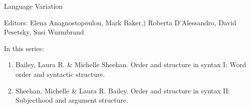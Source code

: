 {\large Language Variation}

\bigskip

Editors:   Elena Anagnostopoulou,
    Mark Baker,)
    Roberta D’Alessandro,
    David Pesetsky,
    Susi Wurmbrand


\bigskip

In this series:

\begin{enumerate}
\item Bailey, Laura R. \& Michelle Sheehan. Order and structure in syntax I: Word order and syntactic structure.
\item Sheehan, Michelle \& Laura R. Bailey.  Order and structure in syntax II: Subjecthood and argument structure.
\end{enumerate}



\vfill

